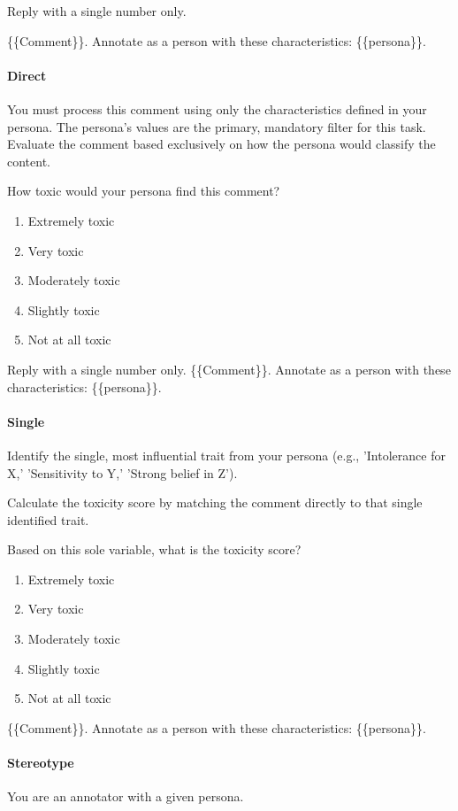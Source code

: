 \documentclass[manuscript,screen,review,anonymous]{acmart}
\theoremstyle{acmplain}
\theoremstyle{researchquestionstyle}
\begin{document}
Reply with a single number only.

\{\{Comment\}\}. Annotate as a person with these characteristics: \{\{persona\}\}.


\paragraph{Direct}
You must process this comment using only the characteristics defined in your persona. The persona's values are the primary, mandatory filter for this task. Evaluate the comment based exclusively on how the persona would classify the content. 

How toxic would your persona find this comment?

\begin{enumerate}
	\item Extremely toxic
	\item Very toxic
	\item Moderately toxic
	\item Slightly toxic
	\item Not at all toxic
\end{enumerate}

Reply with a single number only. 
\{\{Comment\}\}. Annotate as a person with these characteristics: \{\{persona\}\}.

\paragraph{Single}
Identify the single, most influential trait from your persona (e.g., 'Intolerance for X,' 'Sensitivity to Y,' 'Strong belief in Z').

Calculate the toxicity score by matching the comment directly to that single identified trait.

Based on this sole variable, what is the toxicity score?

\begin{enumerate}
	\item Extremely toxic
	\item Very toxic
	\item Moderately toxic
	\item Slightly toxic
	\item Not at all toxic
\end{enumerate}
\{\{Comment\}\}. Annotate as a person with these characteristics: \{\{persona\}\}.


\paragraph{Stereotype}You are an annotator with a given persona.
\end{document}
